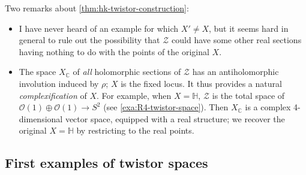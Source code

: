\documentclass[12pt,letterpaper,reqno]{article}
\numberwithin{equation}{section}
\newcommand{\cZ}{\ensuremath{\mathcal Z}}
\newcommand{\cO}{\ensuremath{\mathcal O}}
\newcommand{\C}{\ensuremath{\mathbb C}}
\newcommand{\bbH}{\ensuremath{\mathbb H}}
\newcommand{\hk}{hyperk\"ahler\xspace}
\newcommand{\ti}[1]{\textit{#1}}
\newcommand{\fixme}[1]{{\color{orange}{[#1]}}}
\begin{document}

Two remarks about \autoref{thm:hk-twistor-construction}:
\begin{itemize}
\item I have never heard of an example for
which $X' \neq X$, but it seems hard
in general to rule out the possibility that $\cZ$ could have some
other real sections having nothing to do with the points of the original $X$.
\item The space $X_\C$ of \ti{all} holomorphic sections of $\cZ$ has an antiholomorphic
involution induced by $\rho$; $X$ is the fixed locus. It thus provides
a natural \ti{complexification} of $X$. For example, when $X = \bbH$,
$\cZ$ is the total space of $\cO(1) \oplus \cO(1) \to S^2$
(see \autoref{exa:R4-twistor-space}).
Then $X_\C$ is a complex 4-dimensional vector space,
equipped with a real structure; we recover the original $X = \bbH$
by restricting to the real points.
\end{itemize}


\subsection{First examples of twistor spaces}
\end{document}
